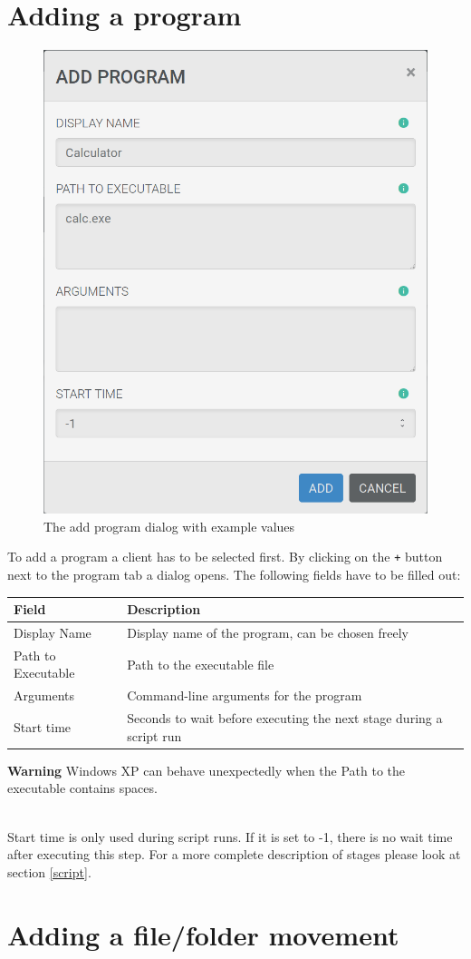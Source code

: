 \documentclass[accentcolor=tud1c, paper=a4, colorback]{tudreport}
\begin{document}
	\section{Adding a program}
	\begin{figure}[h]
		\centering
		\label{add_program}
		\includegraphics[width=.4\textwidth]{add_program}
		\caption{The add program dialog with example values}
	\end{figure}
	To add a program a client has to be selected first. By clicking on the \texttt{+}
	button next to the program tab a dialog opens. The following fields have to be filled
	out:
	\begin{center}
	\begin{tabular}{l|l}
		Field & Description \\\hline
		Display Name &  Display name of the program, can be chosen freely\\
		Path to Executable & Path to the executable file\\
		Arguments & Command-line arguments for the program\\
		Start time & Seconds to wait before executing the next stage during a script run\\
	\end{tabular}
		\begin{tcolorbox}[width=\textwidth, colback=red!30, arc=0pt, boxrule=0pt]
		{\color{red}\textbf{Warning}}\hspace{0.5cm}
		Windows XP can behave unexpectedly when the Path to the executable contains spaces.
		\end{tcolorbox}
	\end{center}
	\\
	Start time is only used during script runs. If it is set to -1, there is
	no wait time after executing this step. For a more complete description of
	stages please look at section \ref{script}.

	\section{Adding a file/folder movement}
\end{document}
